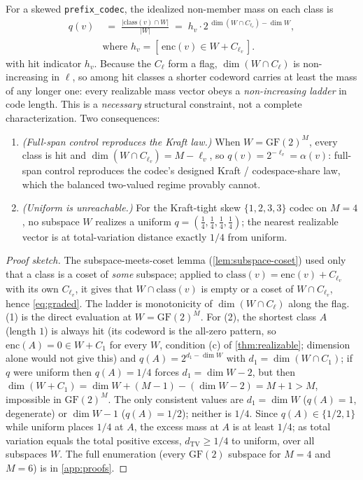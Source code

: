 \documentclass[sigconf,nonacm,anonymous,balance=false]{acmart}
\newcommand{\enc}{\mathrm{enc}}
\newcommand{\TV}{d_{\mathrm{TV}}}
\newcommand{\GF}{\mathrm{GF}(2)}
\newcommand{\class}{\mathrm{class}}
\newcommand{\W}{W}                          %
\newcommand{\al}{\alpha}                    %
\newcommand{\inter}{\cap}
\begin{document}
\begin{theorem}
\label{thm:graded}
For a skewed \texttt{prefix\_codec}, the idealized non-member mass on each class is
\begin{equation}
  \begin{aligned}
  q(v) &\;=\; \frac{|\class(v) \inter \W|}{|\W|}
        \;=\; h_v \cdot 2^{\,\dim(\W \inter C_{\ell_v}) - \dim \W},\\
       &\text{where } h_v = [\, \enc(v) \in \W + C_{\ell_v} \,].
  \end{aligned}
  \label{eq:graded}
\end{equation}
with hit indicator $h_v$. Because the $C_\ell$ form a flag, $\dim(\W \inter C_\ell)$ is
non-increasing in $\ell$, so among hit classes a shorter codeword carries at least the
mass of any longer one: every realizable mass vector obeys a \emph{non-increasing ladder}
in code length. This is a \emph{necessary} structural constraint, not a complete
characterization. Two consequences:
\begin{enumerate}
  \item \emph{(Full-span control reproduces the Kraft law.)} When $\W = \GF^M$, every class is hit and
  $\dim(\W \inter C_{\ell_v}) = M - \ell_v$, so $q(v) = 2^{-\ell_v} = \al(v)$: full-span
  control reproduces the codec's designed Kraft / codespace-share law, which the balanced
  two-valued regime provably cannot.
  \item \emph{(Uniform is unreachable.)} For the Kraft-tight skew $\{1,2,3,3\}$ codec on
  $M = 4$, no subspace $\W$ realizes a uniform $q = (\tfrac14,\tfrac14,\tfrac14,\tfrac14)$;
  the nearest realizable vector is at total-variation distance exactly $1/4$ from uniform.
\end{enumerate}
\end{theorem}

\begin{proof}[Proof sketch]
The subspace-meets-coset lemma (\cref{lem:subspace-coset}) used only that a class is a
coset of \emph{some} subspace; applied to $\class(v) = \enc(v) + C_{\ell_v}$ with its own
$C_{\ell_v}$, it gives that $\W \inter \class(v)$ is empty or a coset of $\W \inter
C_{\ell_v}$, hence \eqref{eq:graded}. The ladder is monotonicity of
$\dim(\W \inter C_\ell)$ along the flag. (1) is the direct evaluation at $\W = \GF^M$.
For (2), the shortest class $A$ (length $1$) is always hit (its codeword is the
all-zero pattern, so $\enc(A) = 0 \in \W + C_1$ for every $\W$, condition (c) of
\cref{thm:realizable}; dimension alone would not give this) and $q(A) = 2^{d_1 - \dim \W}$
with $d_1 = \dim(\W \inter C_1)$; if $q$ were uniform then $q(A) = 1/4$ forces $d_1 =
\dim \W - 2$, but then $\dim(\W + C_1) = \dim \W + (M-1) - (\dim \W - 2) = M + 1 > M$,
impossible in $\GF^M$. The only consistent values are $d_1 = \dim \W$ ($q(A) = 1$,
degenerate) or $\dim \W - 1$ ($q(A) = 1/2$); neither is $1/4$. Since $q(A) \in \{1/2, 1\}$
while uniform places $1/4$ at $A$, the excess mass at $A$ is at least $1/4$; as total variation
equals the total positive excess, $\TV \ge 1/4$ to uniform, over all
subspaces $\W$. The full enumeration (every $\GF$ subspace for $M = 4$ and $M = 6$) is in
\cref{app:proofs}.
\end{proof}
\end{document}
